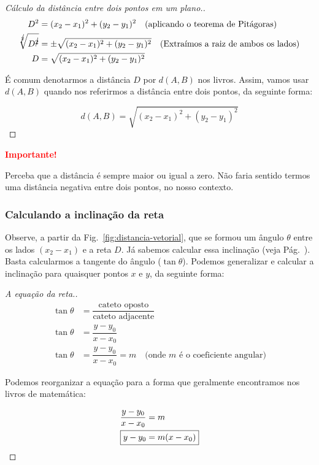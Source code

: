 \documentclass[12pt,openright,twoside,a4paper]{article}
\theoremstyle{definition}
\begin{document}
	\begin{proof}[Cálculo da distância entre dois pontos em um plano.]
		\begin{align*}
			D^2 &= (x_2 - x_1)^2 + (y_2 - y_1)^2  \quad \text{(aplicando o teorema de Pitágoras)}\\
			\sqrt[{\cancel{2}}]{D^{\cancel{2}}} &= \pm \sqrt{(x_2 - x_1)^2 + (y_2 - y_1)^2} \quad \text{(Extraímos a raiz de ambos os lados)}\\
			D &= \sqrt{(x_2 - x_1)^2 + (y_2 - y_1)^2} \qedhere
		\end{align*}
	
		É comum denotarmos a distância $D$ por $d(A,B)$ nos livros. Assim, vamos usar $d(A,B)$ quando nos referirmos a distância entre dois pontos, da seguinte forma:
		
		\begin{equation}
			\boxed{d(A,B) = \sqrt{(x_2 - x_1)^2 + (y_2 - y_1)^2}}
		\end{equation}
		
	\end{proof}

	\begin{snugshade}
		\textbf{\textcolor{red}{Importante!}}
	
		Perceba que a distância é sempre maior ou igual a zero. Não faria sentido termos uma distância negativa entre dois pontos, no nosso contexto.
	\end{snugshade}
	
	\subsubsection{Calculando a inclinação da reta}
	
	Observe, a partir da Fig.~\ref{fig:distancia-vetorial}, que se formou um ângulo $\theta$ entre os lados $(x_2 - x_1)$ e a reta $D$. Já sabemos calcular essa inclinação (veja Pág.~\pageref{tema:coef_angular}). Basta calcularmos a tangente do ângulo ($\tan{\theta}$). Podemos generalizar e calcular a inclinação para quaisquer pontos $x$ e $y$, da seguinte forma:
	
	\begin{proof}[A equação da reta.]
		\begin{align*}
			\tan{\theta} &= \dfrac{\text{cateto oposto}}{\text{cateto adjacente}}\\
			\tan{\theta} &= \dfrac{y - y_0}{x - x_0}\\
			\tan{\theta} &= \dfrac{y - y_0}{x - x_0}=m \quad \text{(onde $m$ é o coeficiente angular)}
		\end{align*}
		
		Podemos reorganizar a equação para a forma que geralmente encontramos nos livros de matemática:
		
		\begin{align*}
			\dfrac{y - y_0}{x - x_0} &= m\\
			\Aboxed{y - y_0 &= m(x - x_0)} \qedhere
		\end{align*}
	\end{proof}
	
\end{document}
